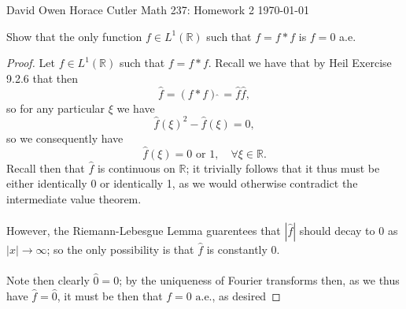 \documentclass[12pt]{article}
\newenvironment{ex}[2][Exercise]{\begin{trivlist}
\item[\hskip \labelsep {\bfseries #1}\hskip \labelsep {\bfseries #2.}]}{\end{trivlist}}
\begin{document}
\noindent David Owen Horace Cutler \hfill {\Large Math 237: Homework 2} \hfill \today

\begin{ex}{1}
    Show that the only function $f \in L^1(\mathbb{R})$ such that $f = f * f$ is $f = 0$ a.e. 
    \begin{proof}
        Let $f \in L^1(\mathbb{R})$ such that $f = f * f$. Recall we have that by Heil Exercise 9.2.6 that then 
        $$\hat{f} = (f * f)\hat{\;} = \hat{f}\hat{f},$$
        so for any particular $\xi$ we have 
        $$\hat{f}(\xi)^2 - \hat{f}(\xi) = 0,$$
        so we consequently have 
        $$\hat{f}(\xi) = 0 \text{ or } 1, \quad \forall \xi \in \mathbb{R}.$$
        Recall then that $\hat{f}$ is continuous on $\mathbb{R}$; it trivially follows that it thus must be either identically 0 or identically 1, as we would otherwise contradict the intermediate value theorem. \\ \\
        However, the Riemann-Lebesgue Lemma guarentees that $|\hat{f}|$ should decay to $0$ as $|x| \rightarrow \infty$; so the only possibility is that $\hat{f}$ is constantly 0. \\ \\
        Note then clearly $\hat{0} = 0$; by the uniqueness of Fourier transforms then, as we thus have $\hat{f} = \hat{0}$, it must be then that $f = 0 \text{ a.e.}$, as desired
    \end{proof}
\end{ex}
\end{document}
